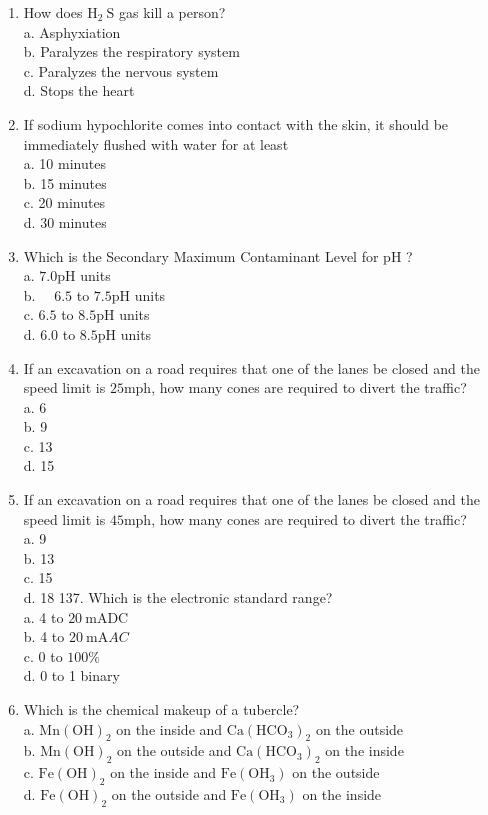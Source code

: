 \documentclass[10pt]{article}
\begin{document}
\begin{enumerate}
  \item How does $\mathrm{H}_{2} \mathrm{~S}$ gas kill a person?\\
a. Asphyxiation\\
b. Paralyzes the respiratory system\\
c. Paralyzes the nervous system\\
d. Stops the heart

  \item If sodium hypochlorite comes into contact with the skin, it should be immediately flushed with water for at least\\
a. 10 minutes\\
b. 15 minutes\\
c. 20 minutes\\
d. 30 minutes

  \item Which is the Secondary Maximum Contaminant Level for $\mathrm{pH}$ ?\\
a. $7.0 \mathrm{pH}$ units\\
b. $\quad 6.5$ to $7.5 \mathrm{pH}$ units\\
c. $6.5$ to $8.5 \mathrm{pH}$ units\\
d. $6.0$ to $8.5 \mathrm{pH}$ units

  \item If an excavation on a road requires that one of the lanes be closed and the speed limit is $25 \mathrm{mph}$, how many cones are required to divert the traffic?\\
a. 6\\
b. 9\\
c. 13\\
d. 15

  \item If an excavation on a road requires that one of the lanes be closed and the speed limit is $45 \mathrm{mph}$, how many cones are required to divert the traffic?\\
a. 9\\
b. 13\\
c. 15\\
d. 18 137. Which is the electronic standard range?\\
a. 4 to $20 \mathrm{~mA} \mathrm{DC}$\\
b. 4 to $20 \mathrm{~mA} A C$\\
c. 0 to $100 \%$\\
d. 0 to 1 binary

  \item Which is the chemical makeup of a tubercle?\\
a. $\mathrm{Mn}(\mathrm{OH})_{2}$ on the inside and $\mathrm{Ca}\left(\mathrm{HCO}_{3}\right)_{2}$ on the outside\\
b. $\mathrm{Mn}(\mathrm{OH})_{2}$ on the outside and $\mathrm{Ca}\left(\mathrm{HCO}_{3}\right)_{2}$ on the inside\\
c. $\mathrm{Fe}(\mathrm{OH})_{2}$ on the inside and $\mathrm{Fe}\left(\mathrm{OH}_{3}\right)$ on the outside\\
d. $\mathrm{Fe}(\mathrm{OH})_{2}$ on the outside and $\mathrm{Fe}\left(\mathrm{OH}_{3}\right)$ on the inside


\end{enumerate}
\end{document}
